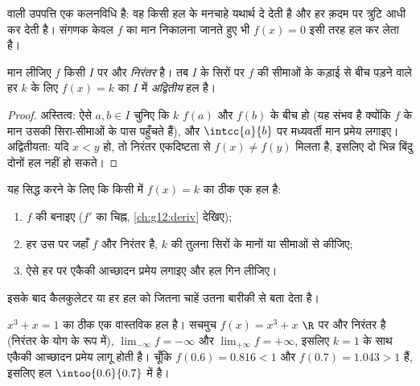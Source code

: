 \begin{remark}
 वाली उपपत्ति एक कलनविधि है: वह किसी हल के मनचाहे यथार्थ  दे
देती है और हर क़दम पर त्रुटि आधी कर देती है। संगणक केवल $f$ का मान निकालना
जानते हुए भी $f(x) = 0$ इसी तरह हल कर लेता है।
\end{remark}

\begin{theorem}[एकैकी आच्छादन प्रमेय]\label{thm:g12:limcont:bijection}
मान लीजिए $f$ किसी  $I$ पर  और \emph{निरंतर } है। तब
$I$ के सिरों पर $f$ की सीमाओं के कड़ाई से बीच पड़ने वाले हर $k$ के लिए
 $f(x) = k$ का $I$ में \emph{अद्वितीय} हल है।
\end{theorem}

\begin{proof}
अस्तित्व: ऐसे $a, b \in I$ चुनिए कि $k$ $f(a)$ और $f(b)$ के बीच हो (यह संभव है
क्योंकि $f$ के मान उसकी सिरा-सीमाओं के पास पहुँचते हैं), और $\intcc{a}{b}$ पर
मध्यवर्ती मान प्रमेय लगाइए। अद्वितीयता: यदि $x < y$ हो, तो निरंतर एकदिष्टता से
$f(x) \neq f(y)$ मिलता है, इसलिए दो भिन्न बिंदु दोनों हल नहीं हो सकते।
\end{proof}

\begin{method}[एकैकी आच्छादन प्रमेय से $f(x) = k$ हल करना]\label{met:g12:limcont:bijection}
यह सिद्ध करने के लिए कि किसी  में $f(x) = k$ का ठीक एक हल है:
\begin{enumerate}
  \item $f$ की  बनाइए ($f'$ का चिह्न, \cref{ch:g12:deriv} देखिए);
  \item हर उस  पर जहाँ $f$  और निरंतर  है, $k$ की तुलना
        सिरों के मानों या सीमाओं से कीजिए;
  \item ऐसे हर  पर एकैकी आच्छादन प्रमेय लगाइए और हल गिन लीजिए।
\end{enumerate}
इसके बाद कैलकुलेटर या  हर हल को जितना चाहें उतना बारीकी से बता देता
है।
\end{method}

\begin{example}\label{ex:g12:limcont:cubic}
 $x^3 + x = 1$ का ठीक एक वास्तविक हल है। सचमुच $f(x) = x^3 + x$ $\R$ पर  और निरंतर
 है (निरंतर  के योग के रूप में), $\lim_{-\infty} f = -\infty$ और $\lim_{+\infty} f = +\infty$, इसलिए
$k = 1$ के साथ एकैकी आच्छादन प्रमेय लागू होती है। चूँकि $f(0.6) = 0.816 < 1$ और $f(0.7) = 1.043 > 1$ हैं,
इसलिए हल $\intoo{0.6}{0.7}$ में है।
\end{example}

